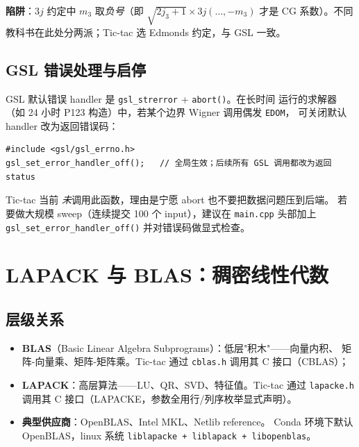 \textbf{陷阱}：$3j$ 约定中 $m_3$ 取\emph{负号}（即 $\sqrt{2j_3+1}\times 3j(\dots,-m_3)$ 才是
CG 系数）。不同教科书在此处分两派；Tic-tac 选 Edmonds 约定，与 GSL 一致。

\subsection{GSL 错误处理与启停}

GSL 默认错误 handler 是 \texttt{gsl\_strerror} + \texttt{abort()}。在长时间
运行的求解器（如 24 小时 P123 构造）中，若某个边界 Wigner 调用偶发 \texttt{EDOM}，
可关闭默认 handler 改为返回错误码：

\begin{lstlisting}[style=cpp]
#include <gsl/gsl_errno.h>
gsl_set_error_handler_off();   // 全局生效；后续所有 GSL 调用都改为返回 status
\end{lstlisting}

Tic-tac 当前 \emph{未}调用此函数，理由是宁愿 abort 也不要把数据问题压到后端。
若要做大规模 sweep（连续提交 100 个 input），建议在 \texttt{main.cpp} 头部加上
\texttt{gsl\_set\_error\_handler\_off()} 并对错误码做显式检查。


\section{LAPACK 与 BLAS：稠密线性代数}
\label{sec:appD:lapack}

\subsection{层级关系}

\begin{itemize}
\item \textbf{BLAS}（Basic Linear Algebra Subprograms）：低层"积木"——向量内积、
      矩阵-向量乘、矩阵-矩阵乘。Tic-tac 通过 \texttt{cblas.h} 调用其
      C 接口（CBLAS）；
\item \textbf{LAPACK}：高层算法——LU、QR、SVD、特征值。Tic-tac 通过
      \texttt{lapacke.h} 调用其 C 接口（LAPACKE，参数全用行/列序枚举显式声明）。
\item \textbf{典型供应商}：OpenBLAS、Intel MKL、Netlib reference。
      Conda 环境下默认 OpenBLAS，linux 系统 \texttt{liblapacke + liblapack + libopenblas}。
\end{itemize}

